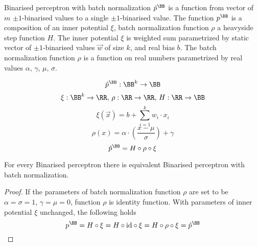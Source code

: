 \begin{definition}
Binarised perceptron with batch normalization $\hat{p}^\BB$
is a function from vector of $m$ $\pm 1$-binarised values
to a single $\pm 1$-binarised value.
The function $p^\BB$ is a composition of an inner potential $\xi$,
batch normalization function $\rho$ a heavyside step function $H$.
The inner potential $\xi$ is weighted sum parametrized by static vector
of $\pm 1$-binarised values $\vec w$ of size $k$, and real bias $b$.
The batch normalization function $\rho$ is a function on real numbers
parametrized by real values $\alpha$, $\gamma$, $\mu$, $\sigma$.

\begin{equation*}
	\hat{p}^\BB: \BB^k \to \BB
\end{equation*}
\begin{equation*}
	\xi: \BB^k \to \RR, \,
	\rho: \RR \to \RR, \,
	H: \RR \to \BB
\end{equation*}
\begin{equation*}
	\xi(\vec x) = b + \sum_{i=1}^k w_i\cdot x_i
\end{equation*}
\begin{equation*}
	\rho(x) = \alpha\cdot \left(\frac{x-\mu}{\sigma}\right) + \gamma
\end{equation*}
\begin{equation*}
	\hat{p}^\BB = H \circ \rho \circ \xi
\end{equation*}
\end{definition}

\begin{lemma}{For every Binarised perceptron there is equivalent Binarised perceptron with batch normalization.}
\begin{proof}
If the parameters of batch normalization function $\rho$ are set to be
$\alpha=\sigma=1$, $\gamma=\mu=0$, function $\rho$ is identity function.
With parameters of inner potential $\xi$ unchanged, the following holds
\begin{equation*}
	p^\BB = H \circ \xi = H \circ \text{id} \circ \xi = H\circ\rho\circ\xi = \hat{p}^\BB
\end{equation*}
\end{proof}
\end{lemma}

